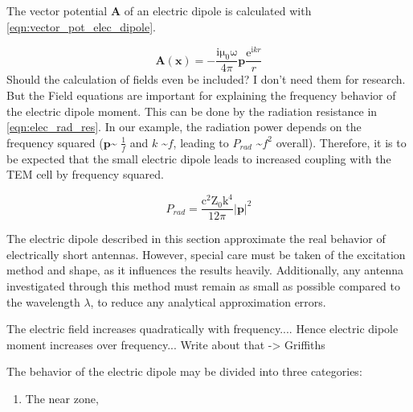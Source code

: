 The vector potential $\mathbf{A}$ of an electric dipole is calculated with \autoref{eqn:vector_pot_elec_dipole}\cite{Jackson}.

\begin{equation}
    \mathbf{A} (\mathbf{x})=-\frac{\mathrm{i\mu_0\omega}}{4\pi}\mathbf{p}\frac{\mathrm{e}^{\mathrm{i}kr}}{r}
    \label{eqn:vector_pot_elec_dipole}
\end{equation}
Should the calculation of fields even be included? I don't need them for research. But the Field equations are important for explaining the frequency behavior of the electric dipole moment. This can be done by the radiation resistance in \autoref{eqn:elec_rad_res}. In our example, the radiation power depends on the frequency squared ($\mathbf{p}$\textasciitilde
$\frac{1}{f}$ and $k$ \textasciitilde $f$, leading to $P_{rad}$ \textasciitilde $f^2$ overall)\cite{Jackson}. Therefore, it is to be expected that the small electric dipole leads to increased coupling with the TEM cell by frequency squared.

\begin{equation}
    P_{rad} = \frac{\mathrm{c}^2\mathrm{Z_0}\mathrm{k}^4}{12\pi}|\mathbf{p}|^2
    \label{eqn:elec_rad_res}
\end{equation}

The electric dipole described in this section approximate the real behavior of electrically short antennas. However, special care must be taken of the excitation method and shape, as it influences the results heavily\cite{Jackson}. Additionally, any antenna investigated through this method must remain as small as possible compared to the wavelength $\lambda$, to reduce any analytical approximation errors. 

The electric field increases quadratically with frequency.... Hence electric dipole moment increases over frequency... Write about that -> Griffiths


The behavior of the electric dipole may be divided into three categories\cite{Griffiths_2024}\cite{Jackson}:
\begin{enumerate}
    \item The near zone, 
\end{enumerate}

